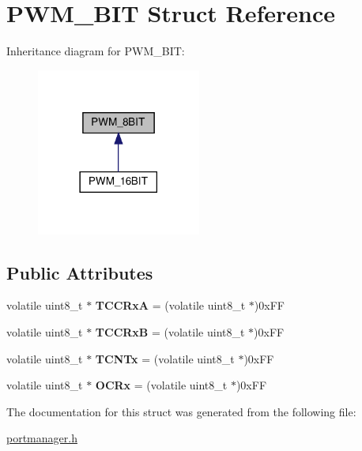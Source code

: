 \hypertarget{structPWM__8BIT}{}\section{P\+W\+M\+\_\+B\+IT Struct Reference}
\label{structPWM__8BIT}


Inheritance diagram for P\+W\+M\+\_\+B\+IT\+:\nopagebreak
\begin{figure}[H]
\begin{center}
\leavevmode
\includegraphics[width=153pt]{structPWM__8BIT__inherit__graph}
\end{center}
\end{figure}
\subsection*{Public Attributes}
\begin{DoxyCompactItemize}
\item 
\mbox{\label{structPWM__8BIT_a67a66abe93d97084f94c41c4bb4264b7}} 
volatile uint8\+\_\+t $\ast$ {\bfseries T\+C\+C\+RxA} = (volatile uint8\+\_\+t $\ast$)0x\+FF
\item 
\mbox{\label{structPWM__8BIT_a9b5a0f38311b0914a5011204a0039255}} 
volatile uint8\+\_\+t $\ast$ {\bfseries T\+C\+C\+RxB} = (volatile uint8\+\_\+t $\ast$)0x\+FF
\item 
\mbox{\label{structPWM__8BIT_ad1f2062ca0b4dce0decf2282f045f56e}} 
volatile uint8\+\_\+t $\ast$ {\bfseries T\+C\+N\+Tx} = (volatile uint8\+\_\+t $\ast$)0x\+FF
\item 
\mbox{\label{structPWM__8BIT_aac6d531b2442f9217341d7c1e27aa54d}} 
volatile uint8\+\_\+t $\ast$ {\bfseries O\+C\+Rx} = (volatile uint8\+\_\+t $\ast$)0x\+FF
\end{DoxyCompactItemize}


The documentation for this struct was generated from the following file\+:\begin{DoxyCompactItemize}
\item 
\hyperlink{portmanager_8h}{portmanager.\+h}\end{DoxyCompactItemize}
